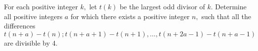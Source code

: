 For each positive integer 
$k,$
 let 
$t(k)$
 be the largest odd divisor of 
$k.$
 Determine all positive integers 
$a$
 for which there exists a positive integer 
$n,$
 such that all the differences
\[t(n+a)-t(n); t(n+a+1)-t(n+1), \ldots, t(n+2a-1)-t(n+a-1)\]
 are divisible by 4.
